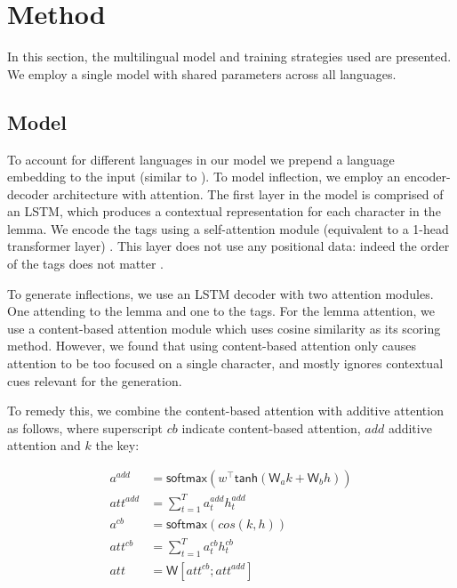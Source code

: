 \documentclass[11pt,a4paper]{article}
\newcommand\jp[1]{\textbf{JP: #1}}
\begin{document}


\section{Method}

In this section, the multilingual model and training strategies used
are presented. We employ a single model with shared parameters
across all languages. 

\subsection{Model}
To account for different languages in our model we prepend a language
embedding to the input (similar to \cite{johnson2017google,
raffel2019exploring}).  To model inflection, we employ an
encoder-decoder architecture with attention. The first layer in the
model is comprised of an LSTM, which produces a contextual
representation for each character in the lemma.  We encode the tags
using a self-attention module (equivalent to a 1-head transformer
layer) \cite{DBLP:conf/nips/VaswaniSPUJGKP17}.  This layer does not
use any positional data: indeed the order of the tags does not matter
\cite{DBLP:conf/emnlp/AnastasopoulosN19}.

To generate inflections, we use an LSTM decoder with two attention
modules. One attending to the lemma and one to the tags. For the lemma
attention, we use a content-based attention module
\cite{graves2014neural, karunaratne2021robust} which uses cosine
similarity as its scoring method.  However, we found that using
content-based attention only causes attention to be too focused on a
single character, and mostly ignores contextual cues relevant for the
generation.

To remedy this, we combine the content-based attention with additive
attention as follows, where superscript $cb$ indicate content-based attention,
$add$ additive attention and $k$ the key:

\begin{align*}
	a^{add} & = \mathsf{softmax}(w^\top\mathsf{tanh}(\mathsf{W}_ak + \mathsf{W}_bh))\\
	att^{add} & = \sum_{t=1}^{T}a_t^{add}h_t^{add}\\
	a^{cb} & = \mathsf{softmax}(cos(k,h))\\
	att^{cb} & = \sum_{t=1}^{T}a_t^{cb}h_t^{cb}\\
	att & = \mathsf{W}[att^{cb}; att^{add}]
\end{align*}
\end{document}
